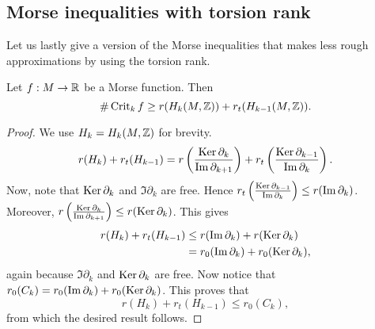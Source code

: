 \subsection{Morse inequalities with torsion rank}

Let us lastly give a version of the Morse inequalities that makes less rough approximations by using the torsion rank.
\begin{theorem}
    Let $f: M \to  \mathbb{R}$ be a Morse function.
    Then
    \[
    \# \operatorname{Crit}_k f \ge r( H_k(M, \mathbb{Z})) + r_t(H_{k-1}(M, \mathbb{Z})).
\]
\end{theorem}
\begin{proof}
    We use $H_k = H_k(M, \mathbb{Z})$ for brevity.
    \begin{align*}
        r(H_k) + r_t(H_{k-1}) = r\left( \frac{\operatorname{Ker} \partial_k}{\operatorname{Im} \partial_{k+1}} \right) + r_t \left( \frac{\operatorname{Ker} \partial_{k-1}}{\operatorname{Im} \partial_k} \right) 
    .\end{align*}
    Now, note that $\operatorname{Ker} \partial_k$ and $\Im \partial_k$ are free. Hence $r_t\left(\frac{\operatorname{Ker} \partial_{k-1}}{\operatorname{Im} \partial_k}\right)\le  r (\operatorname{Im} \partial_k)$.
    Moreover, $r\left( \frac{\operatorname{Ker} \partial_k}{\operatorname{Im} \partial_{k+1}} \right) \le r(\operatorname{Ker} \partial_k)$.
    This gives
    \begin{align*}
        r(H_k) + r_t(H_{k-1})  &\le  r(\operatorname{Im} \partial_k) + r (\operatorname{Ker} \partial_k)\\
                               &= r_0(\operatorname{Im} \partial_k) + r_0 (\operatorname{Ker} \partial_k),
    \end{align*} 
    again because $\Im \partial_k $ and  $\operatorname{Ker} \partial_k$ are free.
    Now notice that $r_0(C_k) = r_0(\operatorname{Im} \partial_k) + r_0(\operatorname{Ker} \partial_k)$.
    This proves that
    \[
        r(H_k) + r_t(H_{k-1}) \le  r_0 (C_k)
    ,\] 
    from which the desired result follows.
\end{proof}


